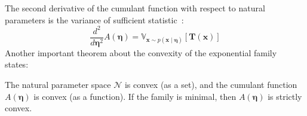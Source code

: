 The second derivative of the cumulant function with respect to natural parameters is the variance of sufficient statistic~\cite{exp-family-jorden-2009}:
$$
\frac{d^2}{d \boldsymbol{\eta}^2} A(\boldsymbol{\eta}) = \mathbb{V}_{\boldsymbol{x} \sim p(\boldsymbol{x}\mid \boldsymbol{\eta})} [\boldsymbol{T}(\boldsymbol{x})]
$$
Another important theorem about the convexity of the exponential family~\cite{exp-family-jorden-2009} states:
\begin{theorem}
The natural parameter space $\mathcal{N}$ is convex (as a set), and the cumulant function $A(\boldsymbol{\eta})$ is convex (as a function). 
If the family is minimal, then $A(\boldsymbol{\eta})$ is strictly convex.
\end{theorem}

